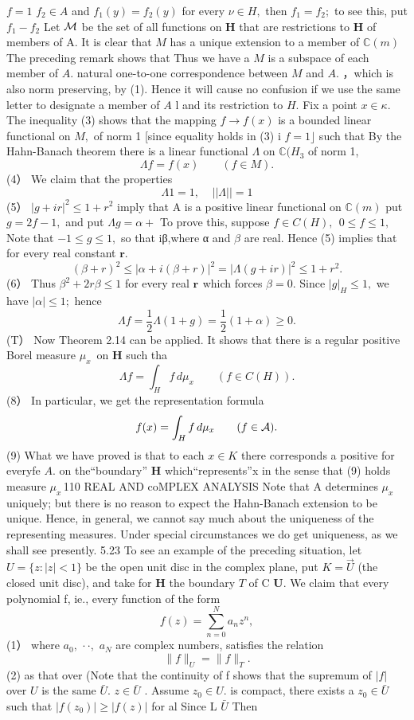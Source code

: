 $f=1$ $f_{2}\in A$ and $f_{1}(y)=f_{2}(y)$ for every $\nu\in H,$ then $f_{1}=f_{2};$ to see this, put $f_{1}-f_{2}$ Let ${\cal M}$ be the set of all functions on ${\boldsymbol{H}}$ that are restrictions to ${\boldsymbol{H}}$ of members of A. It is clear that $\textstyle{M}$ has a unique extension to a member of $\mathbb{C}(m)$ The preceding remark shows that Thus we have a $\textstyle{M}$ is a subspace of each member of $A.$ natural one-to-one correspondence between $\textstyle{M}$ and $A.$ ，which is also norm preserving, by (1). Hence it will cause no confusion if we use the same letter to designate a member of $\scriptstyle A$ l and its restriction to $H.$ Fix a point $x\in\kappa.$ The inequality (3) shows that the mapping $f\to f(x)$ is a bounded linear functional on $\textstyle{M},$ of norm 1 [since equality holds in (3) i $f=1\rfloor$ such that By the Hahn-Banach theorem there is a linear functional $\Lambda$ on $\mathbb{C}(H_{3}$ of norm 1, $$ \Lambda f=f(x)\qquad(f\in M). $$ (4） We claim that the properties $$ \Lambda1=1,~~~~~||\Lambda||=1 $$ (5） $|g+i r|^{2}\leq1+r^{2}$ imply that A is a positive linear functional on $\mathbb{C}(m)$ put $g=2f-1,$ and put $\Lambda g=\alpha+$ To prove this, suppose $f\in C(H),\ \ 0\leq f\leq1,$ Note that $-1\leq g\leq1,$ so that iβ,where α and $\beta$ are real. Hence (5) implies that for every real constant ${\boldsymbol{r}}.$ $$ (\beta+r)^{2}\leq|\alpha+i(\beta+r)|^{2}=|\Lambda(g+i r)|^{2}\leq1+r^{2}. $$ (6） Thus $\beta^{2}+2r\beta\leq1$ for every real ${\boldsymbol{r}}_{}$ which forces $\beta=0.$ Since $|g|_{H}\leq1,$ we have $|\alpha|\leq1;$ hence $$ \Lambda f=\textstyle{\frac{1}{2}}\Lambda(1+g)=\textstyle{\frac{1}{2}}(1+\alpha)\geq0. $$ (T） Now Theorem 2.14 can be applied. It shows that there is a regular positive Borel measure $\mu_{x}\,$ on ${\boldsymbol{H}}$ such tha $$ \Lambda f=\int_{H}f\,d\mu_{x}\qquad(f\in C(H)). $$ (8） In particular, we get the representation formula $$ f(x)=\int_{H}^{}f\,d\mu_{x}\qquad(f\in{\cal A}). $$ (9) What we have proved is that to each $x\in K$ there corresponds a positive for everyfe $A.$ on the“boundary” ${\boldsymbol{H}}$ which“represents”x in the sense that (9) holds measure $\mu_{x}\,$110 REAL AND coMPLEX ANALYSIS Note that A determines $\mu_{x}\,$ uniquely; but there is no reason to expect the Hahn-Banach extension to be unique. Hence, in general, we cannot say much about the uniqueness of the representing measures. Under special circumstances we do get uniqueness, as we shall see presently. 5.23 To see an example of the preceding situation, let $U=\{z\colon|z|<1\}$ be the open unit disc in the complex plane, put $K={\vec{U}}$ (the closed unit disc), and take for ${\boldsymbol{H}}$ the boundary ${\mathbf{}}T$ of C ${\boldsymbol{U}}.$ We claim that every polynomial f, ie., every function of the form $$ f(z)=\sum_{n=0}^{N}a_{n}z^{n}, $$ (1） where $a_{0},\,\cdot\cdot,$ $a_{N}$ are complex numbers, satisfies the relation $$ \|f\|_{U}=\|f\|_{T}. $$ (2) as that over (Note that the continuity of f shows that the supremum of $|f|$ over $U$ is the same ${\bar{U}}.$ $z\in{\bar{U}}$ . Assume $z_{0}\in U.$ is compact, there exists a $z_{0}\in{\bar{U}}$ such that $|f(z_{0})|\geq|f(z)|$ for al Since L $\bar{U}$ Then $$ 